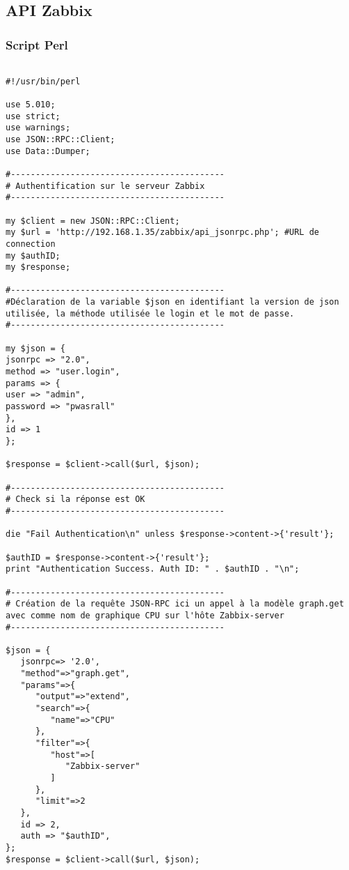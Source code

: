 \newpage

\subsection{\label{API}API Zabbix}

		\subsubsection{Script Perl}
		\vspace{0.3cm}
\begin{verbatim}

#!/usr/bin/perl

use 5.010;
use strict;
use warnings;
use JSON::RPC::Client;
use Data::Dumper;

#-------------------------------------------
# Authentification sur le serveur Zabbix
#-------------------------------------------

my $client = new JSON::RPC::Client;
my $url = 'http://192.168.1.35/zabbix/api_jsonrpc.php'; #URL de connection
my $authID;
my $response;

#-------------------------------------------
#Déclaration de la variable $json en identifiant la version de json utilisée, la méthode utilisée le login et le mot de passe.
#-------------------------------------------

my $json = {
jsonrpc => "2.0",
method => "user.login",
params => {
user => "admin",
password => "pwasrall"
},
id => 1
};

$response = $client->call($url, $json);

#-------------------------------------------
# Check si la réponse est OK
#-------------------------------------------

die "Fail Authentication\n" unless $response->content->{'result'};

$authID = $response->content->{'result'};
print "Authentication Success. Auth ID: " . $authID . "\n";

#-------------------------------------------
# Création de la requête JSON-RPC ici un appel à la modèle graph.get avec comme nom de graphique CPU sur l'hôte Zabbix-server
#-------------------------------------------

$json = {
   jsonrpc=> '2.0',
   "method"=>"graph.get",
   "params"=>{
      "output"=>"extend",
      "search"=>{
         "name"=>"CPU"
      },
      "filter"=>{
         "host"=>[
            "Zabbix-server"
         ]
      },
      "limit"=>2
   },
   id => 2,
   auth => "$authID",
};
$response = $client->call($url, $json);


\end{verbatim}
